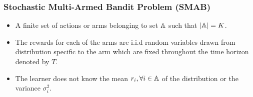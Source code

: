 \begin{frame}
\frametitle{Stochastic Multi-Armed Bandit Problem (SMAB)}
\begin{itemize}
\item<1-> A finite set of actions or arms belonging to set $\mathbb{A}$ such that $|\mathbb{A}|=K$. 
\item<2-> The rewards for each of the arms are i.i.d random variables drawn from distribution specific to the arm which are fixed throughout the time horizon denoted by $T$.
\item<3-> The learner does not know the mean $r_{i},\forall i\in \mathbb{A}$ of the distribution or the variance $\sigma_i^2$. 
\end{itemize}
\end{frame}



